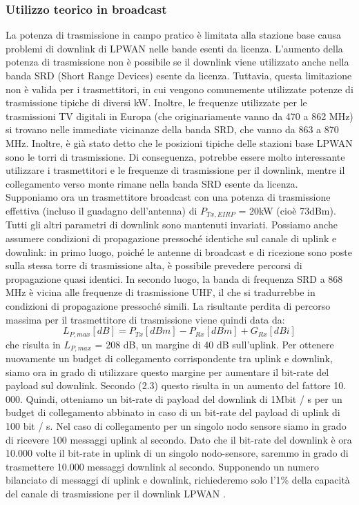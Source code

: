 \documentclass[a4paper]{report} %
\begin{document}
\subsubsection{Utilizzo teorico in broadcast}
La potenza di trasmissione in campo pratico è limitata alla stazione base causa problemi di downlink di LPWAN nelle bande esenti da licenza. L'aumento della potenza di trasmissione non è possibile se il downlink viene utilizzato anche nella banda SRD (Short Range Devices) esente da licenza. Tuttavia, questa limitazione non è valida per i trasmettitori, in cui vengono comunemente utilizzate potenze di trasmissione tipiche di diversi kW. Inoltre, le frequenze utilizzate per le trasmissioni TV digitali in Europa (che originariamente vanno da 470 a 862 MHz) si trovano nelle immediate vicinanze della banda SRD, che vanno da 863 a 870 MHz. Inoltre, è già stato detto che le posizioni tipiche delle stazioni base LPWAN sono le torri di trasmissione. Di conseguenza, potrebbe essere molto interessante utilizzare i trasmettitori e le frequenze di trasmissione per il downlink, mentre il collegamento verso monte rimane nella banda SRD esente da licenza. Supponiamo ora un trasmettitore broadcast con una potenza di trasmissione effettiva (incluso il guadagno dell'antenna) di $P_{Tx, EIRP}$ = 20kW (cioè 73dBm). Tutti gli altri parametri di downlink sono mantenuti invariati. Possiamo anche assumere condizioni di propagazione pressoché identiche sul canale di uplink e downlink: in primo luogo, poiché le antenne di broadcast e di ricezione sono poste sulla stessa torre di trasmissione alta, è possibile prevedere percorsi di propagazione quasi identici. In secondo luogo, la banda di frequenza SRD a 868 MHz è vicina alle frequenze di trasmissione UHF, il che si tradurrebbe in condizioni di propagazione pressoché simili. La risultante perdita di percorso massima per il trasmettitore di trasmissione viene quindi data da:
\begin{equation}
L_{P,max}[dB] = P_{Tx}[dBm]-P_{Rx}[dBm]+G_{Rx}[dBi]  
\end{equation}
che risulta in $L_{P, max}$ = 208 dB, un margine di 40 dB sull'uplink. Per ottenere nuovamente un budget di collegamento corrispondente tra uplink e downlink, siamo ora in grado di utilizzare questo margine per aumentare il bit-rate del payload sul downlink. Secondo (2.3) questo risulta in un aumento del fattore 10. 000. Quindi, otteniamo un bit-rate di payload del downlink di 1Mbit / s per un budget di collegamento abbinato in caso di un bit-rate del payload di uplink di 100 bit / s. Nel caso di collegamento per un singolo nodo sensore siamo in grado di ricevere 100 messaggi uplink al secondo. Dato che il bit-rate del downlink è ora 10.000 volte il bit-rate in uplink di un singolo nodo-sensore, saremmo in grado di trasmettere 10.000 messaggi downlink al secondo. Supponendo un numero bilanciato di messaggi di uplink e downlink, richiederemo solo l'1\% della capacità del canale di trasmissione per il downlink LPWAN \cite{art:rif.40}.
\end{document}

